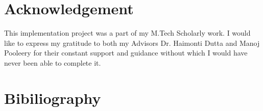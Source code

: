 \documentclass[amsart, 12pt]{article}
\begin{document}
\section{Acknowledgement}
This implementation project was a part of my M.Tech Scholarly work. I would like to express my gratitude to both my Advisors Dr. Haimonti Dutta and Manoj Pooleery for their constant support and guidance without which I would have never been able to complete it.

\nocite{cdnc,eval,noisy,vaadin}

\section{Bibiliography}


\end{document}
